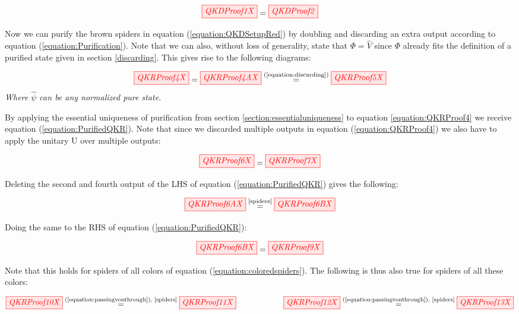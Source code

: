 \documentclass[]{article}
\newcommand{\equaltext}[1]{\ensuremath{\stackrel{\text{#1}}{=}}}
\begin{document}
\begin{equation}
	\label{equation:QKDSetupRed}
	\tikzfig{QKDProof1X} = \tikzfig{QKDProof2}
\end{equation}

Now we can purify the brown spiders in equation (\ref{equation:QKDSetupRed}) by doubling and discarding an extra output according to equation (\ref{equation:Purification}). Note that we can also, without loss of generality, state that $\Phi = \hat{V}$ since $\Phi$ already fits the definition of a purified state given in section \ref{discarding}. This gives rise to the following diagrams:

\begin{equation}
	\label{equation:QKRProof4}
	\tikzfig{QKRProof4X} = \tikzfig{QKRProof4AX} \equaltext{(\ref{equation:discarding})} \tikzfig{QKRProof5X}
\end{equation}
\textit{Where $\hat{\psi}$ can be any normalized pure state.}

By applying the essential uniqueness of purification from section \ref{section:essentialuniqueness} to equation \ref{equation:QKRProof4} we receive equation (\ref{equation:PurifiedQKR}). Note that since we discarded multiple outputs in equation (\ref{equation:QKRProof4}) we also have to apply the unitary U over multiple outputs:

\begin{equation}
	\label{equation:PurifiedQKR}
	\tikzfig{QKRProof6X} = \tikzfig{QKRProof7X}
\end{equation}

Deleting the second and fourth output of the LHS of equation (\ref{equation:PurifiedQKR}) gives the following:

\begin{equation}
	\tikzfig{QKRProof6AX} \equaltext{\ref{spiders}} \tikzfig{QKRProof6BX}
\end{equation}

Doing the same to the RHS of equation (\ref{equation:PurifiedQKR}):

\begin{equation}
	\label{equation:passingvonthrough}
	 \tikzfig{QKRProof6BX} = \tikzfig{QKRProof9X}
\end{equation}

Note that this holds for spiders of all colors of equation (\ref{equation:coloredspiders}). The following is thus also true for spiders of all these colors:

\begin{equation}
\label{equation:vrules}
	\tikzfig{QKRProof10X} \equaltext{(\ref{equation:passingvonthrough}), \ref{spiders}} \tikzfig{QKRProof11X} ~~~~~~~~~~~~~~~~~~ \tikzfig{QKRProof12X} \equaltext{(\ref{equation:passingvonthrough}), \ref{spiders}} \tikzfig{QKRProof13X}
\end{equation}
\end{document}
